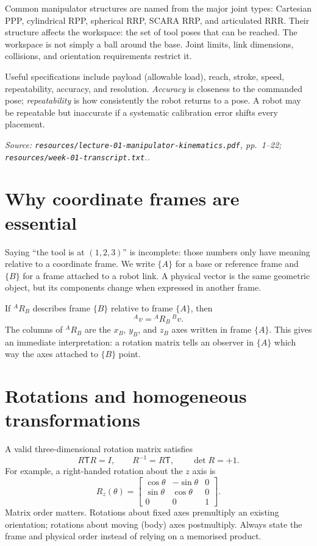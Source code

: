 \documentclass[11pt,a4paper]{article}
\renewcommand{\texttt}[1]{\nolinkurl{#1}}
\newcommand{\trans}{\mathsf{T}}
\newcommand{\source}[1]{\par\smallskip\noindent\textit{Source: #1.}\par\smallskip}
\begin{document}
Common manipulator structures are named from the major joint types: Cartesian PPP, cylindrical RPP, spherical RRP, SCARA RRP, and articulated RRR. Their structure affects the workspace: the set of tool poses that can be reached. The workspace is not simply a ball around the base. Joint limits, link dimensions, collisions, and orientation requirements restrict it.

Useful specifications include payload (allowable load), reach, stroke, speed, repeatability, accuracy, and resolution. \emph{Accuracy} is closeness to the commanded pose; \emph{repeatability} is how consistently the robot returns to a pose. A robot may be repeatable but inaccurate if a systematic calibration error shifts every placement.
\source{\texttt{resources/lecture-01-manipulator-kinematics.pdf}, pp.~1--22; \texttt{resources/week-01-transcript.txt}.}

\section{\enspace Why coordinate frames are essential}
Saying ``the tool is at $(1,2,3)$'' is incomplete: those numbers only have meaning relative to a coordinate frame. We write $\{A\}$ for a base or reference frame and $\{B\}$ for a frame attached to a robot link. A physical vector is the same geometric object, but its components change when expressed in another frame.

If ${}^{A}\!R_B$ describes frame $\{B\}$ relative to frame $\{A\}$, then
\[
 {}^{A}\!v={}^{A}\!R_B\,{}^{B}\!v.
\]
The columns of ${}^{A}\!R_B$ are the $x_B$, $y_B$, and $z_B$ axes written in frame $\{A\}$. This gives an immediate interpretation: a rotation matrix tells an observer in $\{A\}$ which way the axes attached to $\{B\}$ point.

\section{\enspace Rotations and homogeneous transformations}
A valid three-dimensional rotation matrix satisfies
\[
 R\trans R=I,\qquad R^{-1}=R\trans,\qquad\det R=+1.
\]
For example, a right-handed rotation about the $z$ axis is
\[
 R_z(\theta)=\begin{bmatrix}
 \cos\theta&-\sin\theta&0\\
 \sin\theta&\cos\theta&0\\
 0&0&1
 \end{bmatrix}.
\]
Matrix order matters. Rotations about fixed axes premultiply an existing orientation; rotations about moving (body) axes postmultiply. Always state the frame and physical order instead of relying on a memorised product.
\end{document}
